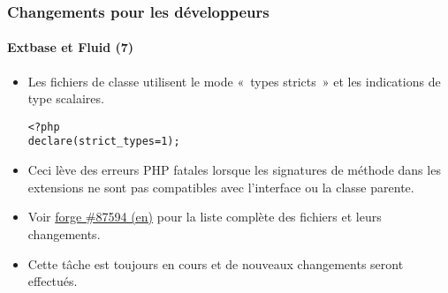 \begin{frame}[fragile]
	\frametitle{Changements pour les développeurs}
	\framesubtitle{Extbase et Fluid (7)}

	\lstset{basicstyle=\smaller\ttfamily}

	\begin{itemize}
		\item Les fichiers de classe utilisent le mode «~types stricts~» et les indications de type scalaires.

\begin{lstlisting}
<?php
declare(strict_types=1);
\end{lstlisting}

		\item Ceci lève des erreurs PHP fatales lorsque les signatures de méthode dans les extensions
			ne sont pas compatibles avec l'interface ou la classe parente.

		\item Voir \href{https://forge.typo3.org/issues/87594}{forge \#87594 (en)}
			pour la liste complète des fichiers et leurs changements.

		\item Cette tâche est toujours en cours et de nouveaux changements seront effectués.

	\end{itemize}

\end{frame}


